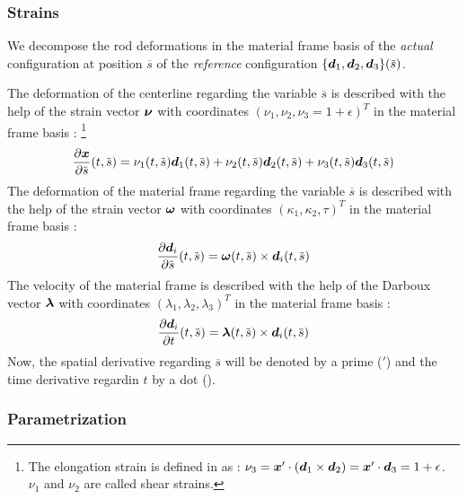 \subsubsection{Strains}

We decompose the rod deformations in the material frame basis of the \emph{actual} configuration at position $\overbar{s}$ of the \emph{reference} configuration $\{\vect{d}_1, \vect{d}_2, \vect{d}_3\}(\overbar{s})$.

The deformation of the centerline regarding the variable $\overbar{s}$ is described with the help of the strain vector $\boldsymbol{\nu}$ with coordinates $(\nu_1, \nu_2, \nu_3 = 1 + \epsilon)^T$ in the material frame basis : \footnote{The elongation strain is defined in \cite[pp.~283]{Antman2005} as : $\nu_3 = \boldsymbol{x}' \cdot (\boldsymbol{d}_1 \times \boldsymbol{d}_2) =  \boldsymbol{x}' \cdot \boldsymbol{d}_3 = 1+\epsilon$. $\nu_1$ and $\nu_2$ are called shear strains.}
\begin{equation}
		\frac{\partial \vect{x}}{\partial \overbar{s}} (t, \overbar{s})  = {\nu_1}(t, \overbar{s}) \vect{d}_1(t, \overbar{s})
		+ {\nu_2}(t, \overbar{s}) \vect{d}_2(t, \overbar{s})
		+ {\nu_3}(t, \overbar{s}) \vect{d}_3(t, \overbar{s})
\end{equation}
The deformation of the material frame regarding the variable $\overbar{s}$ is described with the help of the strain vector $\boldsymbol{\omega}$ with coordinates $(\kappa_1, \kappa_2, \tau)^T$ in the material frame basis :
\begin{equation}	
		\frac{\partial \vect{d}_i}{\partial \overbar{s}} (t, \overbar{s}) = \vect{\omega}(t, \overbar{s}) \times  \vect{d}_i (t, \overbar{s})
\end{equation}
The velocity of the material frame is described with the help of the Darboux vector $\boldsymbol{\lambda}$ with coordinates $(\lambda_1, \lambda_2, \lambda_3)^T$ in the material frame basis :
\begin{equation}	
		\frac{\partial \vect{d}_i}{\partial t} (t, \overbar{s}) = \vect{\lambda}(t, \overbar{s}) \times  \vect{d}_i (t, \overbar{s})
\end{equation}
Now, the spatial derivative regarding $\overbar{s}$ will be denoted by a prime (${}'$) and the time derivative regardin $t$ by a dot ($\dot{}$).

\subsubsection{Parametrization}

